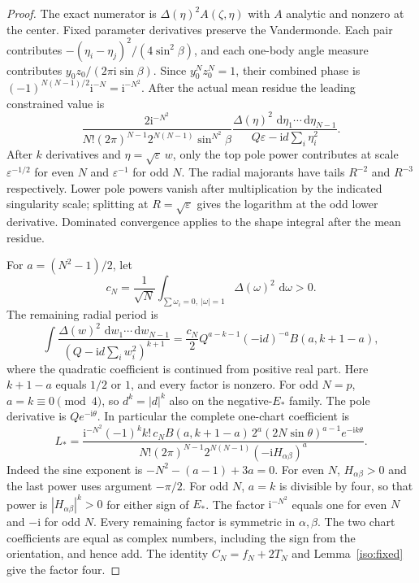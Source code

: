 \documentclass[11pt]{article}
\numberwithin{equation}{section}
\theoremstyle{definition}
\newcommand{\ii}{\mathrm i}
\newcommand{\dd}{\,\mathrm d}
\newcommand{\eps}{\varepsilon}
\begin{document}
\begin{proof}
The exact numerator is $\Delta(\eta)^2 A(\zeta,\eta)$ with $A$ analytic
and nonzero at the center. Fixed parameter derivatives preserve the
Vandermonde. Each pair contributes
$-(\eta_i-\eta_j)^2/(4\sin^2\beta)$, and each one-body angle measure
contributes $y_0z_0/(2\pi\ii\sin\beta)$. Since $y_0^Nz_0^N=1$,
their combined phase is
$(-1)^{N(N-1)/2}\ii^{-N}=\ii^{-N^2}$.
After the actual mean residue the leading constrained value is
\[
 \frac{2\ii^{-N^2}}{N!(2\pi)^{N-1}2^{N(N-1)}\sin^{N^2}\beta}
 \frac{\Delta(\eta)^2\,\dd\eta_1\cdots\dd\eta_{N-1}}
 {Q\eps-\ii d\sum_i\eta_i^2}.
\]
After $k$ derivatives and $\eta=\sqrt\eps\,w$, only the top pole
power contributes at scale $\eps^{-1/2}$ for even $N$ and
$\eps^{-1}$ for odd $N$. The radial majorants have tails $R^{-2}$
and $R^{-3}$ respectively. Lower pole powers vanish after multiplication
by the indicated singularity scale; splitting at $R=\sqrt\eps$ gives
the logarithm at the odd lower derivative. Dominated convergence
applies to the shape integral after the mean residue.

For $a=(N^2-1)/2$, let
\[
 c_N=\frac1{\sqrt N}\int_{\sum\omega_i=0,\ |\omega|=1}
                         \Delta(\omega)^2\,\dd\omega>0.
\]
The remaining radial period is
\[
 \int\frac{\Delta(w)^2\,\dd w_1\cdots\dd w_{N-1}}
 {(Q-\ii d\sum_iw_i^2)^{k+1}}
 =\frac{c_N}{2}Q^{a-k-1}(-\ii d)^{-a}
 B(a,k+1-a),
\]
where the quadratic coefficient is continued from positive real part.
Here $k+1-a$ equals $1/2$ or $1$, and every factor is nonzero.
For odd $N=p$, $a=k\equiv0\pmod4$, so $d^k=|d|^k$ also on the
negative-$E_*$ family. The pole derivative is $Qe^{-\ii\theta}$.
In particular the complete one-chart coefficient is
\begin{equation}
 L_*=
 \frac{\ii^{-N^2}(-1)^k k!\,c_N B(a,k+1-a)\,
       2^a(2N\sin\theta)^{a-1}e^{-\ii k\theta}}
 {N!(2\pi)^{N-1}2^{N(N-1)}(-\ii H_{\alpha\beta})^a}.
 \label{iso:amplitude}
\end{equation}
Indeed the sine exponent is $-N^2-(a-1)+3a=0$.
For even $N$, $H_{\alpha\beta}>0$ and the last power uses argument
$-\pi/2$. For odd $N$, $a=k$ is divisible by four, so that power is
$|H_{\alpha\beta}|^k>0$ for either sign of $E_*$.
The factor $\ii^{-N^2}$ equals one for even $N$ and $-\ii$ for odd
$N$. Every remaining factor is symmetric in $\alpha,\beta$.
The two chart coefficients are equal as complex numbers, including
the sign from the orientation, and hence add. The identity
$C_N=f_N+2T_N$ and Lemma~\ref{iso:fixed} give the factor four.
\end{proof}
\end{document}
